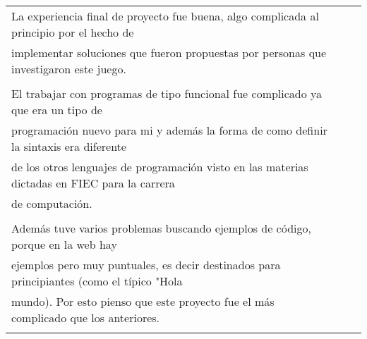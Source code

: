 \documentclass[letterpaper,11pt]{article}
\begin{document}
\begin{tabular}{lll}

La experiencia final de proyecto fue buena, algo complicada al principio por el hecho de\\
implementar soluciones que fueron propuestas por personas que investigaron este juego.\\\\
El trabajar con programas de tipo funcional fue complicado ya que era un tipo de\\
programaci\'on nuevo para mi y adem\'as la forma de como definir la sintaxis era diferente\\
de los otros lenguajes de programaci\'on visto en las materias dictadas en FIEC para la carrera\\
de computaci\'on.\\\\
Adem\'as tuve varios problemas buscando ejemplos de c\'odigo, porque en la web hay\\
ejemplos pero muy puntuales, es decir destinados para principiantes (como el t\'ipico "Hola\\
mundo). Por esto pienso que este proyecto fue el m\'as complicado que los anteriores.\\\\

\end{tabular}
\end{document}
